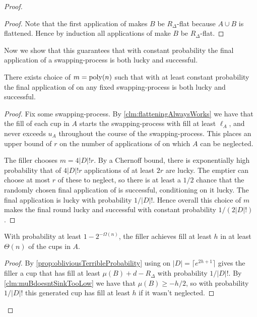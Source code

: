 \begin{proof}
\begin{proof}
  Note that the first application of \flatalg makes $B$ be
  $R_\Delta$-flat because $A\cup B$ is flattened. 
  Hence by induction all applications of \flatalg make $B$ be
  $R_\Delta$-flat.
\end{proof}

Now we show that this guarantees that with constant probability
the final application of \randalg a swapping-process is both
lucky and successful. 
\begin{clm}
  There exists choice of $m = \operatorname{\text{poly}}(n)$ such that with at least
  constant probability the final application of \randalg on any
  fixed swapping-process is both lucky and successful.
\end{clm}
\begin{proof}
  Fix some swapping-process. By \cref{clm:flatteningAlwaysWorks}
  we have that the fill of each cup in $A$ starts the
  swapping-process with fill at least $\ell_A$, and never exceeds
  $u_A$ throughout the course of the swapping-process. This
  places an upper bound of $r$ on the number of applications of
  \randalg on which $A$ can be neglected. 

  The filler chooses $m = 4|D|! r$. By a Chernoff bound, there is
  exponentially high probability that of $4|D|! r$ applications
  of \randalg at least $2r$ are lucky.
  The emptier can choose at most $r$ of these to neglect, so
  there is at least a $1/2$ chance that the randomly chosen final
  application of \randalg is successful, conditioning on it
  lucky. The final application is lucky with probability
  $1/|D|!$. 
  Hence overall this choice of $m$ makes the final round lucky
  and successful with constant probability $1/(2|D|!)$.
\end{proof}

\begin{clm}
With probability at least $1-2^{-\Omega(n)}$, the filler achieves fill
at least $h$ in at least $\Theta(n)$ of the cups in $A$. 
\end{clm}
\begin{proof}
  By \cref{prop:obliviousTerribleProbability} using \randalg on
  $|D| = \lceil e^{2h+1} \rceil$ gives the filler a cup that
  has fill at least $\mu(B) + d-R_\Delta$ with probability
  $1/|D|!$. By \cref{clm:muBdoesntSinkTooLow} we have that
  $\mu(B) \ge -h/2$, so with probability $1/|D|!$ this generated
  cup has fill at least $h$ if it wasn't neglected.


\end{proof}
\end{proof}
